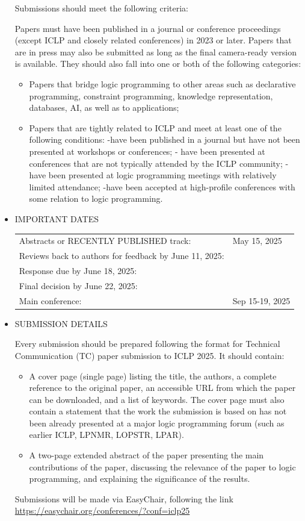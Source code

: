 \documentclass[prodmode,acmtecs]{acmsmall} %
\begin{document}
\begin{itemize}
  Submissions should meet the following criteria: 
 
  Papers must have been published in a journal or conference proceedings (except ICLP and closely related conferences) in 2023 or later.  Papers that are in press may also be submitted as long as the final camera-ready version is available. They should also fall into one or both of the following categories: 
 
\begin{itemize}\item  Papers that bridge logic programming to other areas such as declarative programming, constraint programming, knowledge representation, databases, AI, as well as to applications;
\item Papers that are tightly related to ICLP and meet at least one of the following conditions: -have been published in a journal but have not been presented at workshops or conferences; - have been presented at conferences that are not typically attended by the ICLP community; -have been presented at logic programming meetings with relatively limited attendance; -have been accepted at high-profile conferences with some relation to logic programming.
\end{itemize} 
\item  IMPORTANT DATES 
 
\begin{tabulary}{\linewidth}{LL}Abstracts or RECENTLY PUBLISHED track:  & May 15, 2025 \\
Reviews back to authors for feedback by June 11, 2025:  &  \\
Response due by June 18, 2025:  &  \\
Final decision by June 22, 2025:  &  \\
Main conference:  & Sep 15-19, 2025 \\
\end{tabulary}
 
\item  SUBMISSION DETAILS 
 
 Every submission should be prepared following the format for Technical Communication (TC) paper submission to ICLP 2025. It should contain: 
 
\begin{itemize}\item  A cover page (single page) listing the title, the authors, a complete reference to the original paper, an accessible URL from which the paper can be downloaded, and a list of keywords. The cover page must also contain a statement that the work the submission is based on has not been already presented at a major logic programming forum (such as earlier ICLP, LPNMR, LOPSTR, LPAR).
\item  A two-page extended abstract of the paper presenting the main contributions of the paper, discussing the relevance of the paper to logic programming, and explaining the significance of the results.
\end{itemize} 
  Submissions will be made via EasyChair, following the link \href{https://easychair.org/conferences/?conf=iclp25}{https://easychair.org/conferences/?conf=iclp25} 
 

\end{itemize}
\end{document}
